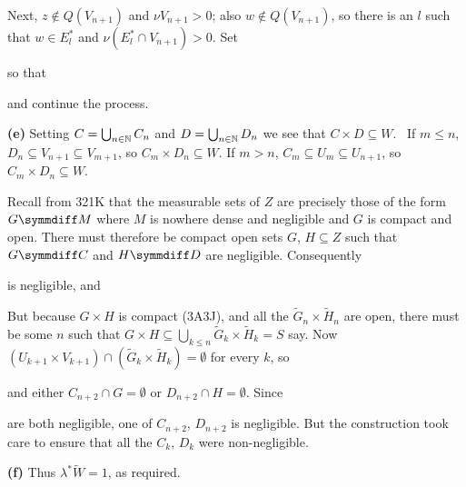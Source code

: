 {

\noindent Next, $z\notin Q(V_{n+1})$ and $\nu V_{n+1}>0$;  also
$w\notin Q(V_{n+1})$, so there is an $l$ such that $w\in E^*_l$ and
$\nu(E^*_l\cap V_{n+1})>0$.   Set


\noindent so that



\noindent and continue the process.
\Qed

\medskip

{\bf (e)} Setting $C=\bigcup_{n\in\Bbb N}C_n$
and $D=\bigcup_{n\in\Bbb N}D_n$ we see that $C\times D\subseteq W$.
\Prf\ If $m\le n$,
$D_n\subseteq V_{n+1}\subseteq V_{m+1}$, so $C_m\times D_n\subseteq W$.
If $m>n$, $C_m\subseteq U_m\subseteq U_{n+1}$, so $C_m\times
D_n\subseteq W$.\ \Qed

Recall from 321K that the measurable sets of $Z$ are precisely those of
the form $G\symmdiff M$ where $M$ is nowhere dense and negligible and
$G$ is compact and open.   There must therefore be compact open sets
$G$, $H\subseteq Z$ such that $G\symmdiff C$ and $H\symmdiff D$ are
negligible.   Consequently


\noindent is negligible, and


\noindent But because $G\times H$ is compact (3A3J), and all the
$\tilde G_n\times \tilde H_n$ are open, there must be some $n$ such that
$G\times H\subseteq\bigcup_{k\le n}\tilde G_k\times\tilde H_k=S$ say.
Now $(U_{k+1}\times V_{k+1})\cap(\tilde G_k\times \tilde H_k)=\emptyset$
for every $k$, so


\noindent and either $C_{n+2}\cap G=\emptyset$ or
$D_{n+2}\cap H=\emptyset$.   Since


\noindent are both negligible, one of $C_{n+2}$, $D_{n+2}$ is
negligible.   But the construction took care to ensure that all the
$C_k$, $D_k$ were non-negligible.\ \Bang

\medskip

{\bf (f)} Thus $\lambda^*\tilde W=1$, as required.
}%

